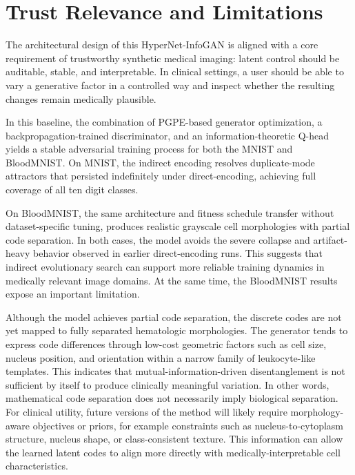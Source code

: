 \documentclass[letterpaper]{article} %
\begin{document}
	\section{Trust Relevance and Limitations}
	The architectural design of this HyperNet-InfoGAN is aligned with a core requirement of trustworthy synthetic medical imaging: latent control should be auditable, stable, and interpretable. In clinical settings, a user should be able to vary a generative factor in a controlled way and inspect whether the resulting changes remain medically plausible. 
	
	In this baseline, the combination of PGPE-based generator optimization, a backpropagation-trained discriminator, and an information-theoretic Q-head yields a stable adversarial training process for both the MNIST and BloodMNIST. On MNIST, the indirect encoding resolves duplicate-mode attractors that persisted indefinitely under direct-encoding, achieving full coverage of all ten digit classes. 
	
	On BloodMNIST, the same architecture and fitness schedule transfer without dataset-specific tuning, produces realistic grayscale cell morphologies with partial code separation. In both cases, the model avoids the severe collapse and artifact-heavy behavior observed in earlier direct-encoding runs. This suggests that indirect evolutionary search can support more reliable training dynamics in medically relevant image domains. At the same time, the BloodMNIST results expose an important limitation.
	
	Although the model achieves partial code separation, the discrete codes are not yet mapped to fully separated hematologic morphologies. The generator tends to express code differences through low-cost geometric factors such as cell size, nucleus position, and orientation within a narrow family of leukocyte-like templates. This indicates that mutual-information-driven disentanglement is not sufficient by itself to produce clinically meaningful variation. In other words, mathematical code separation does not necessarily imply biological separation. For clinical utility, future versions of the method will likely require morphology-aware objectives or priors, for example constraints such as nucleus-to-cytoplasm structure, nucleus shape, or class-consistent texture. This information can allow the learned latent codes to align more directly with medically-interpretable cell characteristics.
	
\end{document}
